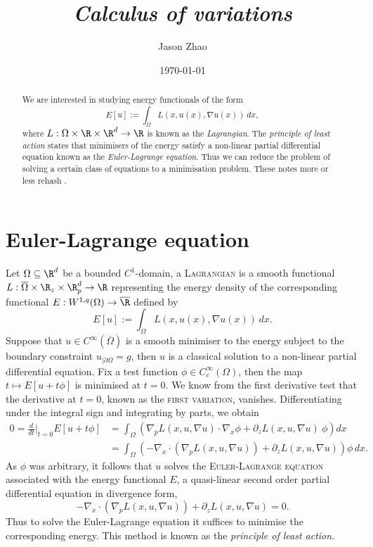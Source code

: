 \documentclass[reqno]{amsart}
\title
{
	\emph{Calculus of variations}
}
\author{Jason Zhao}
\date{\today}
\theoremstyle{definition}
\theoremstyle{remark}
\renewcommand{\emph}{\textsc}
\begin{document}
\maketitle

\begin{abstract}
	We are interested in studying energy functionals of the form
		\[ E [u] := \int_\Omega L(x, u(x), \nabla u(x)) \, dx, \]
	where $L: \Omega \times \R \times \R^d \to \R$ is known as the \textit{Lagrangian}. The \textit{principle of least action} states that minimisers of the energy satisfy a non-linear partial differential equation known as the \textit{Euler-Lagrange equation}. Thus we can reduce the problem of solving a certain class of equations to a minimisation problem. These notes more or less rehash \cite[Chapter 8]{Evans2010}.
\end{abstract}

\tableofcontents

\section{Euler-Lagrange equation}

Let $\Omega \subseteq \R^d$ be a bounded $C^1$-domain, a \emph{Lagrangian} is a smooth functional $L : \overline\Omega \times \R_z \times \R^d_p \to \R$ representing the energy density of the corresponding functional $E : W^{1, q} (\Omega) \to \overline\R$ defined by 
	\[ E[u] := \int_\Omega L(x, u(x), \nabla u (x)) \, dx. \]
Suppose that $u \in C^\infty (\overline \Omega)$ is a smooth minimiser to the energy subject to the boundary constraint $u_{|\partial \Omega} = g$, then $u$ is a classical solution to a non-linear partial differential equation. Fix a test function $\phi \in C^\infty_c (\Omega)$, then the map $t \mapsto E[u + t \phi]$ is minimised at $t = 0$. We know from the first derivative test that the derivative at $t = 0$, known as the \emph{first variation}, vanishes. Differentiating under the integral sign and integrating by parts, we obtain
	\begin{align*}
		 0 = \frac{d}{dt} \Big|_{t = 0} E[u + t \phi] 
		 	&=  \int_\Omega \left(\nabla_p L (x, u, \nabla u) \cdot \nabla_x \phi + \partial_z L (x, u, \nabla u) \ \phi\right) dx \\
			&= \int_\Omega \left( - \nabla_x \cdot (\nabla_p L  (x, u, \nabla u)) + \partial_z L (x, u, \nabla u)  \right)  \phi \, dx.
	\end{align*}	 
As $\phi$ was arbitrary, it follows that $u$ solves the \emph{Euler-Lagrange equation} associated with the energy functional $E$, a quasi-linear second order partial differential equation in divergence form, 
	\[ - \nabla_x \cdot (\nabla_p L  (x, u, \nabla u)) + \partial_z L (x, u, \nabla u) = 0. \]
Thus to solve the Euler-Lagrange equation it suffices to minimise the corresponding energy. This method is known as the \textit{principle of least action}. 
\end{document}
